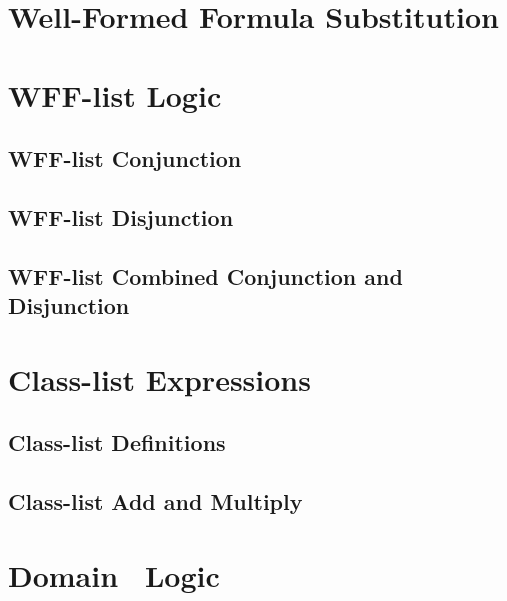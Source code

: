 \documentclass[fleqn,openany]{book}
\newcommand{\logicid}{Domain}
\begin{document}
\section{Well-Formed Formula Substitution}
\allowdisplaybreaks{

}  %

\section{WFF-list Logic}
\subsection{WFF-list Conjunction}
\allowdisplaybreaks{

}  %

\subsection{WFF-list Disjunction}
\allowdisplaybreaks{

}  %

\subsection{WFF-list Combined Conjunction and Disjunction}
\allowdisplaybreaks{

}  %

\section{Class-list Expressions}
\subsection{Class-list Definitions}\label{subsec:classlist}
\allowdisplaybreaks{

}  %

\subsection{Class-list Add and Multiply}
\allowdisplaybreaks{

}  %

\section{\logicid~ Logic}
\end{document}
